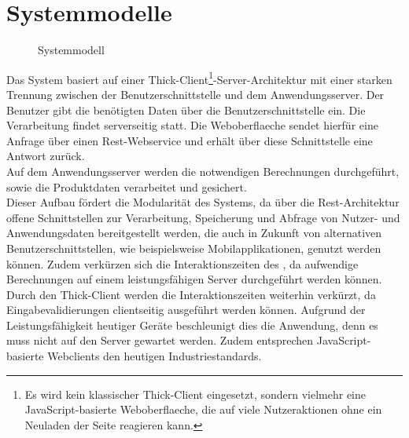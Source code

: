 \section{Systemmodelle}
\begin{figure}[!htb]
	\caption{Systemmodell}
	\resizebox{\textwidth}{!} {
		
	}
\end{figure}
Das System basiert auf einer Thick-Client\footnote{Es wird kein klassischer Thick-Client eingesetzt, sondern vielmehr eine JavaScript-basierte \gls{Weboberflaeche}, die auf viele Nutzeraktionen ohne ein Neuladen der Seite reagieren kann.}-Server-Architektur mit einer starken Trennung zwischen der Benutzerschnittstelle und dem Anwendungsserver. Der \gls{Benutzer} gibt die benötigten Daten über die Benutzerschnittstelle ein. Die Verarbeitung findet serverseitig statt. Die \gls{Weboberflaeche} sendet hierfür eine Anfrage über einen \gls{Rest}-\gls{Webservice} und erhält über diese Schnittstelle eine Antwort zurück. \\
Auf dem Anwendungsserver werden die notwendigen Berechnungen durchgeführt, sowie die Produktdaten verarbeitet und gesichert. \\
Dieser Aufbau fördert die Modularität des Systems, da über die \gls{Rest}-Architektur offene Schnittstellen zur Verarbeitung, Speicherung und Abfrage von Nutzer- und Anwendungsdaten bereitgestellt werden, die auch in Zukunft von alternativen Benutzerschnittstellen, wie beispielsweise Mobilapplikationen, genutzt werden können. Zudem verkürzen sich die Interaktionszeiten des , da aufwendige Berechnungen auf einem leistungsfähigen Server durchgeführt werden können. Durch den Thick-Client werden die Interaktionszeiten weiterhin verkürzt, da Eingabevalidierungen clientseitig ausgeführt werden können. Aufgrund der Leistungsfähigkeit heutiger Geräte beschleunigt dies die Anwendung, denn es muss nicht auf den Server gewartet werden. Zudem entsprechen JavaScript-basierte Webclients den heutigen Industriestandards. 